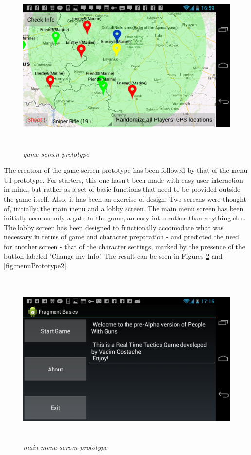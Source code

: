 \begin{figure}
\includegraphics[height=3.5in,width=6.23in]{./images/android_screenshots/ui_prototype/UI_prototype_5.png}  
\caption{\small \sl game screen prototype \label{fig:UIPrototype5}}
\end{figure}


The creation of the game screen prototype has been followed by that of the menu
UI prototype. For starters, this one hasn't been made with easy user interaction
in mind, but rather as a set of basic functions that need to be provided
outside the game itself. Also, it has been an exercise of design. Two screens
were thought of, initially: the main menu and a lobby screen. The main menu
screen has been initially seen as only a gate to the game, an easy intro rather
than anything else. The lobby screen has been designed to functionally
accomodate what was necessary in terms of game and character preparation
- and predicted the need for another screen - that of the character settings,
marked by the presence of the button labeled 'Change my Info'. The result can be
seen in Figures \ref{fig:menuPrototype1} and \ref{fig:menuPrototype2}.

\begin{figure}
\includegraphics[height=3.5in,width=6.23in]{./images/android_screenshots/menu_prototype/MENU_prototype_1.png}  
\caption{\small \sl main menu screen prototype \label{fig:menuPrototype1}}
\end{figure}

